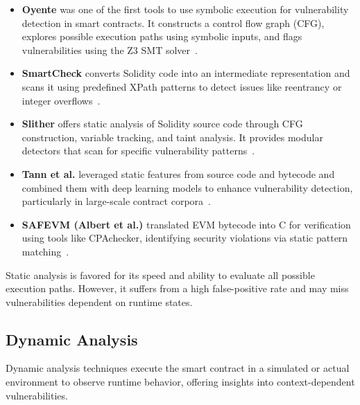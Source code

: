 \begin{itemize}
  \item \textbf{Oyente} was one of the first tools to use symbolic execution for vulnerability detection in smart contracts. It constructs a control flow graph (CFG), explores possible execution paths using symbolic inputs, and flags vulnerabilities using the Z3 SMT solver~\cite{durieux2020empirical}.
  \item \textbf{SmartCheck} converts Solidity code into an intermediate representation and scans it using predefined XPath patterns to detect issues like reentrancy or integer overflows~\cite{durieux2020empirical}.
  \item \textbf{Slither} offers static analysis of Solidity source code through CFG construction, variable tracking, and taint analysis. It provides modular detectors that scan for specific vulnerability patterns~\cite{durieux2020empirical}.
  \item \textbf{Tann et al.} leveraged static features from source code and bytecode and combined them with deep learning models to enhance vulnerability detection, particularly in large-scale contract corpora~\cite{tann2020towards}.
  \item \textbf{SAFEVM (Albert et al.)} translated EVM bytecode into C for verification using tools like CPAchecker, identifying security violations via static pattern matching~\cite{albert2019safevm}.
\end{itemize}

Static analysis is favored for its speed and ability to evaluate all possible execution paths. However, it suffers from a high false-positive rate and may miss vulnerabilities dependent on runtime states.

\subsection*{Dynamic Analysis}

Dynamic analysis techniques execute the smart contract in a simulated or actual environment to observe runtime behavior, offering insights into context-dependent vulnerabilities.

